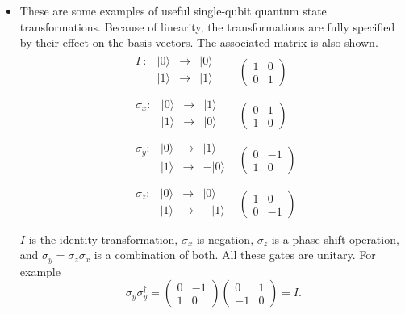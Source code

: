 \documentclass{article}
\def\pagedone{\newpage}
\def\ket#1{|{#1}\rangle}
\begin{document}
\pagedone


\begin{itemize}
	\item  These are some examples of useful single-qubit quantum state transformations.
Because of linearity, the transformations are fully specified by
their effect on the basis vectors. 
The associated matrix is also shown.
$$\begin{array}{ll}
\begin{array}{lrcl}
I\ :& \ket{0} & \to & \ket{0}\\
  & \ket{1} & \to & \ket{1}\\
\end{array} &
\left(\begin{array}{cc}1 & 0\\ 0 & 1\end{array}\right)\\
\begin{array}{lrcl}
\sigma_x:& \ket{0} & \to & \ket{1}\\
  & \ket{1} & \to & \ket{0}\\
\end{array} &
\left(\begin{array}{cc}0 & 1\\ 1 & 0\end{array}\right)\\
\begin{array}{lrcl}
\sigma_y:& \ket{0} & \to & \ket{1}\\
  & \ket{1} & \to &-\ket{0}\\
\end{array} &
\left(\begin{array}{cc}0 & -1\\ 1 & 0\end{array}\right)\\
\begin{array}{lrcl}
\sigma_z:& \ket{0} & \to & \ket{0}\\
  & \ket{1} & \to & -\ket{1}\\
\end{array} &
\left(\begin{array}{cc}1 & 0\\ 0 & -1\end{array}\right)\\
\end{array}$$ 
$I$ is the identity transformation, $\sigma_x$ is negation, $\sigma_z$ is
a phase shift operation, and $\sigma_y = \sigma_z\sigma_x$ is a combination of both.  
All these gates are unitary.  For example
$$\sigma_y\sigma_y^\dag = \left(\begin{array}{cc}0 & -1\\ 1 & 0\end{array}\right) 
	 \left(\begin{array}{cc}0 & 1\\ -1 & 0\end{array}\right) = I.$$


\end{itemize}
\end{document}
